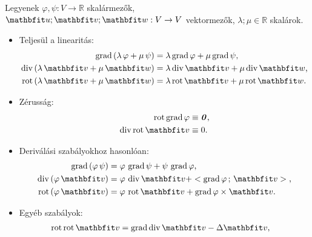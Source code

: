 \documentclass[lang=magyar]{math-handout}
\begin{document}
\begin{identities}
  Legyenek $\varphi, \psi: V \rightarrow \mathbb R$ skalármezők, $\rvec u;
    \rvec v; \rvec w: V \rightarrow V$ vektormezők, $\lambda; \mu \in \mathbb R$
  skalárok.
  \begin{itemize}
    \item Teljesül a linearitás:\vspace{-.33cm}
          \begin{align*}
            \grad \left( \lambda \, \varphi + \mu \, \psi \right)
             & =
            \lambda \grad \varphi + \mu \grad \psi
            \text,
            \\
            \Div \left( \lambda \, \rvec v + \mu \, \rvec w \right)
             & =
            \lambda \Div \rvec v + \mu \Div \rvec w
            \text,
            \\
            \rot \left( \lambda \, \rvec v + \mu \, \rvec w \right)
             & =
            \lambda \rot \rvec v + \mu \rot \rvec w
            \text.
          \end{align*}
    \item Zérusság:\vspace{-.33cm}
          \begin{align*}
            \rot \grad \varphi & \equiv \nvec
            \text,
            \\
            \Div \rot \rvec v  & \equiv 0
            \text.
          \end{align*}
    \item Deriválási szabályokhoz hasonlóan:
          \begin{align*}
            \grad \left( \varphi \, \psi \right)
             & =
            \varphi \, \grad \psi + \psi \, \grad \varphi
            \text,
            \\
            \Div \left( \varphi \, \rvec v \right)
             & =
            \varphi \, \Div \rvec v + \scalar{\grad \varphi}{\rvec v}
            \text,
            \\
            \rot \left( \varphi \, \rvec v \right)
             & =
            \varphi \, \rot \rvec v + \grad \varphi \times \rvec v
            \text.
          \end{align*}
    \item Egyéb szabályok:\vspace{-.33cm}
          \begin{align*}
            \rot \rot \rvec v
             & =
            \grad \Div \rvec v - \Delta \rvec v
            \text,

\end{align*}
\end{itemize}
\end{identities}
\end{document}
